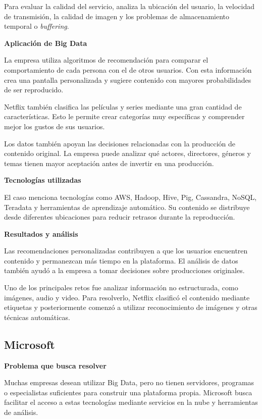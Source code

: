 Para evaluar la calidad del servicio, analiza la ubicación del usuario, la velocidad de transmisión, la calidad de imagen y los problemas de almacenamiento temporal o \textit{buffering}.

\textbf{Aplicación de Big Data}

La empresa utiliza algoritmos de recomendación para comparar el comportamiento de cada persona con el de otros usuarios. Con esta información crea una pantalla personalizada y sugiere contenido con mayores probabilidades de ser reproducido.

Netflix también clasifica las películas y series mediante una gran cantidad de características. Esto le permite crear categorías muy específicas y comprender mejor los gustos de sus usuarios.

Los datos también apoyan las decisiones relacionadas con la producción de contenido original. La empresa puede analizar qué actores, directores, géneros y temas tienen mayor aceptación antes de invertir en una producción.

\textbf{Tecnologías utilizadas}

El caso menciona tecnologías como AWS, Hadoop, Hive, Pig, Cassandra, NoSQL, Teradata y herramientas de aprendizaje automático. Su contenido se distribuye desde diferentes ubicaciones para reducir retrasos durante la reproducción.

\textbf{Resultados y análisis}

Las recomendaciones personalizadas contribuyen a que los usuarios encuentren contenido y permanezcan más tiempo en la plataforma. El análisis de datos también ayudó a la empresa a tomar decisiones sobre producciones originales.

Uno de los principales retos fue analizar información no estructurada, como imágenes, audio y video. Para resolverlo, Netflix clasificó el contenido mediante etiquetas y posteriormente comenzó a utilizar reconocimiento de imágenes y otras técnicas automáticas.

\subsection{Microsoft}

\textbf{Problema que busca resolver}

Muchas empresas desean utilizar Big Data, pero no tienen servidores, programas o especialistas suficientes para construir una plataforma propia. Microsoft busca facilitar el acceso a estas tecnologías mediante servicios en la nube y herramientas de análisis.

